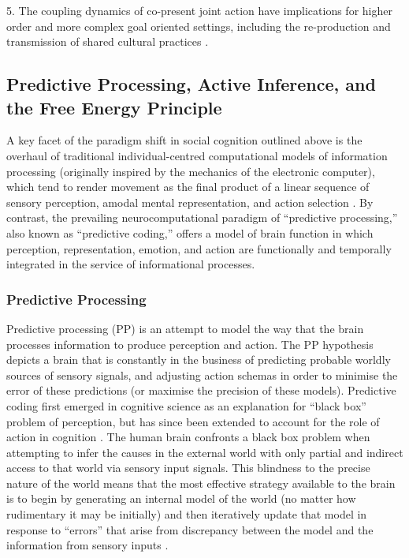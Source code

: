 \begin{CJK}{UTF8}{gbsn}
5. The coupling dynamics of co-present joint action have implications for higher order and more complex goal oriented settings, including the re-production and transmission of shared cultural practices \citep{Dunbar2012,Roepstorff2010,Claidiere2014}.



\subsection{Predictive Processing, Active Inference, and the Free Energy Principle}
A key facet of the paradigm shift in social cognition outlined above is the overhaul of traditional individual-centred computational models of information processing (originally inspired by the mechanics of the electronic computer), which tend to render movement as the final product of a linear sequence of sensory perception, amodal mental representation, and action selection \citep{Lewis2005}.  By contrast, the prevailing neurocomputational paradigm of ``predictive processing,'' also known as ``predictive coding,'' \citep[see][]{Frith2007,Kilner2009,Clark2013} offers a model of brain function in which perception, representation, emotion, and action are functionally and temporally integrated in the service of informational processes.

\subsubsection{Predictive Processing}
Predictive processing (PP) is an attempt to model the way that the brain processes information to produce perception and action. The PP hypothesis depicts a brain that is constantly in the business of predicting probable worldly sources of sensory signals, and adjusting action schemas in order to minimise the error of these predictions (or maximise the precision of these models). Predictive coding first emerged in cognitive science as an explanation for ``black box'' problem of perception, but has since been extended to account for the role of action in cognition \citep{Friston2010}.
The human brain confronts a black box problem when attempting to infer the causes in the external world with only partial and indirect access to that world via sensory input signals. This blindness to the precise nature of the world means that the most effective strategy available to the brain is to begin by generating an internal model of the world (no matter how rudimentary it may be initially) and then iteratively update that model in response to ``errors'' that arise from discrepancy between the model and the information from sensory inputs \citep{Frith2007}.


\end{CJK}

